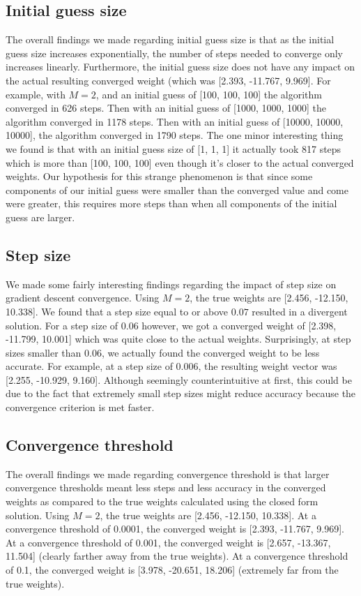 \documentclass{article}
\begin{document}
\subsection{Initial guess size}
The overall findings we made regarding initial guess size is that as the initial guess size increases exponentially, the number of steps needed to converge only increases linearly. Furthermore, the initial guess size does not have any impact on the actual resulting converged weight (which was  [2.393, -11.767, 9.969]. For example, with $M = 2$, and an initial guess of [100, 100, 100] the algorithm converged in 626 steps. Then with an initial guess of [1000, 1000, 1000] the algorithm converged in 1178 steps. Then with an initial guess of [10000, 10000, 10000], the algorithm converged in 1790 steps. The one minor interesting thing we found is that with an initial guess size of [1, 1, 1]  it actually took 817 steps which is more than [100, 100, 100] even though it's closer to the actual converged weights. Our hypothesis for this strange phenomenon is that since some components of our initial guess were smaller than the converged value and come were greater, this requires more steps than when all components of the initial guess are larger.

\subsection{Step size}
We made some fairly interesting findings regarding the impact of step size on gradient descent convergence. Using $M = 2$, the true weights are [2.456, -12.150, 10.338]. We found that a step size equal to or above $0.07$ resulted in a divergent solution. For a step size of $0.06$ however, we got a converged weight of [2.398, -11.799, 10.001] which was quite close to the actual weights. Surprisingly, at step sizes smaller than $0.06$, we actually found the converged weight to be less accurate. For example, at a step size of $0.006$, the resulting weight vector was [2.255, -10.929, 9.160]. Although seemingly counterintuitive at first, this could be due to the fact that extremely small step sizes might reduce accuracy because the convergence criterion is met faster.

\subsection{Convergence threshold}
The overall findings we made regarding convergence threshold is that larger convergence thresholds meant less steps and less accuracy in the converged weights as compared to the true weights calculated using the closed form solution. Using $M = 2$, the true weights are [2.456, -12.150, 10.338]. At a convergence threshold of 0.0001, the converged weight is [2.393, -11.767, 9.969]. At a convergence threshold of 0.001, the converged weight is [2.657, -13.367, 11.504] (clearly farther away from the true weights). At a convergence threshold of 0.1, the converged weight is [3.978, -20.651, 18.206] (extremely far from the true weights).
\end{document}
